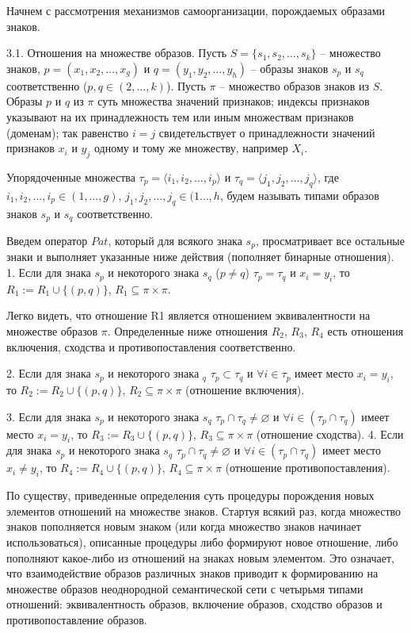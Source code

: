 Начнем с рассмотрения механизмов самоорганизации, порождаемых образами знаков.

3.1. Отношения на множестве образов. Пусть $S=\{s_1,s_2,\dots,s_k\}$ – множество знаков, $p=(x_1,x_2,\dots,x_g)$ и $q=(y_1,y_2,\dots,y_h)$ – образы знаков $s_p$ и $s_q$ соответственно ($p,q\in(2,\dots,k)$).
Пусть $\pi$ – множество образов знаков из $S$. Образы $p$ и $q$ из $\pi$ суть множества значений признаков; индексы признаков указывают на их принадлежность тем или иным множествам признаков (доменам); так равенство $i=j$ свидетельствует о принадлежности значений признаков $x_i$ и $y_j$ одному и тому же множеству, например $X_i$.

Упорядоченные множества $\tau_p=\langle i_1,i_2,\dots,i_p\rangle$ и $\tau_q=\langle j_1,j_2,\dots,j_q\rangle$, где $i_1,i_2,\dots,i_p\in(1,\dots,g)$, $j_1,j_2,\dots,j_q\in(1\dots,h$, будем называть типами образов знаков $s_p$ и $s_q$ соответственно.

Введем оператор $Pat$, который для всякого знака $s_p$, просматривает все остальные знаки и выполняет указанные ниже действия (пополняет бинарные отношения).
1. Если для знака $s_p$ и некоторого знака $s_q$ ($p\not =q$) $\tau_p=\tau_q$ и $x_i=y_i$, то $R_1:=R_1\cup\{(p,q)\}$, $R_1\subseteq\pi\times\pi$.

Легко видеть, что отношение R1 является отношением эквивалентности на множестве образов $\pi$. Определенные ниже отношения $R_2$, $R_3$, $R_4$ есть отношения включения, сходства и противопоставления соответственно.

2. Если для знака $s_p$ и некоторого знака $_q$ $\tau_p\subset\tau_q$ и $\forall i\in\tau_p$ имеет место $x_i=y_i$, то $R_2:=R_2\cup\{(p,q)\}$, $R_2\subseteq\pi\times\pi$ (отношение включения).

3. Если для знака $s_p$ и некоторого знака $s_q$ $\tau_p\cap\tau_q\not =\varnothing$ и $\forall i\in(\tau_p\cap\tau_q)$ имеет место $x_i=y_i$, то $R_3:=R_3\cup\{(p,q)\}$, $R_3\subseteq\pi\times\pi$ (отношение сходства).
4. Если для знака $s_p$ и некоторого знака $s_q$ $\tau_p\cap\tau_q\not =\varnothing$ и $\forall i\in(\tau_p\cap\tau_q)$ имеет место $x_i\not =y_i$, то $R_4:=R_4\cup\{(p,q)\}$, $R_4\subseteq\pi\times\pi$ (отношение противопоставления).

По существу, приведенные определения суть процедуры порождения новых элементов отношений на множестве знаков. Стартуя всякий раз, когда множество знаков пополняется новым знаком (или когда множество знаков начинает использоваться), описанные процедуры либо формируют новое отношение, либо пополняют какое-либо из отношений на знаках новым элементом. Это означает, что взаимодействие образов различных знаков приводит к формированию на множестве образов неоднородной семантической сети \cite{Osipov1990} с четырьмя типами отношений: эквивалентность образов, включение образов, сходство образов и противопоставление образов.

